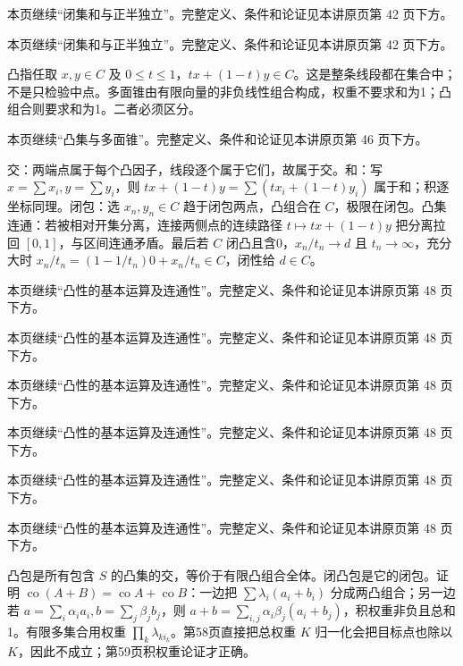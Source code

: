 本页继续“闭集和与正半独立”。完整定义、条件和论证见本讲原页第 42 页下方。

本页继续“闭集和与正半独立”。完整定义、条件和论证见本讲原页第 42 页下方。

凸指任取 $x,y\in C$ 及 $0\le t\le1$，$tx+(1-t)y\in C$。这是整条线段都在集合中；不是只检验中点。多面锥由有限向量的非负线性组合构成，权重不要求和为1；凸组合则要求和为1。二者必须区分。

本页继续“凸集与多面锥”。完整定义、条件和论证见本讲原页第 46 页下方。

交：两端点属于每个凸因子，线段逐个属于它们，故属于交。和：写 $x=\sum x_i,y=\sum y_i$，则 $tx+(1-t)y=\sum(tx_i+(1-t)y_i)$ 属于和；积逐坐标同理。闭包：选 $x_n,y_n\in C$ 趋于闭包两点，凸组合在 $C$，极限在闭包。凸集连通：若被相对开集分离，连接两侧点的连续路径 $t\mapsto tx+(1-t)y$ 把分离拉回 $[0,1]$，与区间连通矛盾。最后若 $C$ 闭凸且含0，$x_n/t_n\to d$ 且 $t_n\to\infty$，充分大时 $x_n/t_n=(1-1/t_n)0+x_n/t_n\in C$，闭性给 $d\in C$。

本页继续“凸性的基本运算及连通性”。完整定义、条件和论证见本讲原页第 48 页下方。

本页继续“凸性的基本运算及连通性”。完整定义、条件和论证见本讲原页第 48 页下方。

本页继续“凸性的基本运算及连通性”。完整定义、条件和论证见本讲原页第 48 页下方。

本页继续“凸性的基本运算及连通性”。完整定义、条件和论证见本讲原页第 48 页下方。

本页继续“凸性的基本运算及连通性”。完整定义、条件和论证见本讲原页第 48 页下方。

本页继续“凸性的基本运算及连通性”。完整定义、条件和论证见本讲原页第 48 页下方。

凸包是所有包含 $S$ 的凸集的交，等价于有限凸组合全体。闭凸包是它的闭包。证明 $\operatorname{co}(A+B)=\operatorname{co}A+\operatorname{co}B$：一边把 $\sum\lambda_i(a_i+b_i)$ 分成两凸组合；另一边若 $a=\sum_i\alpha_i a_i,b=\sum_j\beta_j b_j$，则 $a+b=\sum_{i,j}\alpha_i\beta_j(a_i+b_j)$，积权重非负且总和1。有限多集合用权重 $\prod_k\lambda_{ki_k}$。第58页直接把总权重 $K$ 归一化会把目标点也除以 $K$，因此不成立；第59页积权重论证才正确。

